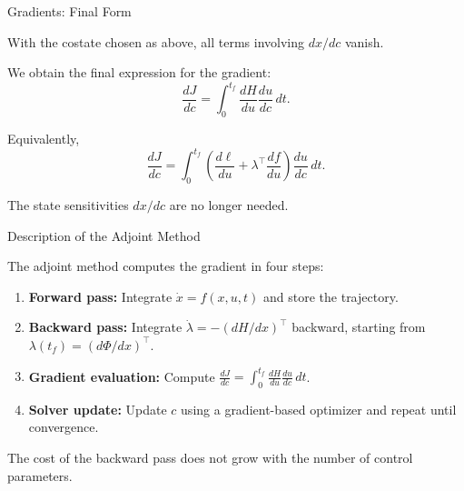 \documentclass{beamer}
\begin{document}
\begin{frame}{Gradients: Final Form}
	\begin{flushleft}
		With the costate chosen as above, all terms involving
		$dx/dc$ vanish.
		
		\bigskip
		
		We obtain the final expression for the gradient:
		\[
		\boxed{
			\frac{dJ}{dc}
			=
			\int_0^{t_f}
			\frac{dH}{du}\frac{du}{dc}\,dt.
		}
		\]
		
		\bigskip
		
		Equivalently,
		\[
		\boxed{
			\frac{dJ}{dc}
			=
			\int_0^{t_f}
			\left(
			\frac{d\ell}{du}
			+\lambda^\top\frac{df}{du}
			\right)
			\frac{du}{dc}\,dt.
		}
		\]
		
		The state sensitivities $dx/dc$ are no longer needed.
	\end{flushleft}
\end{frame}

\begin{frame}{Description of the Adjoint Method}
	\begin{flushleft}
		The adjoint method computes the gradient in four steps:
		
		\begin{enumerate}
			\item \textbf{Forward pass:}
			Integrate $\dot{x}=f(x,u,t)$ and store the trajectory.
			
			\item \textbf{Backward pass:}
			Integrate $\dot{\lambda}=-(dH/dx)^\top$ backward,
			starting from $\lambda(t_f)=(d\Phi/dx)^\top$.
			
			\item \textbf{Gradient evaluation:}
			Compute $\displaystyle
			\frac{dJ}{dc}=\int_0^{t_f}
			\frac{dH}{du}\frac{du}{dc}\,dt$.
			
			\item \textbf{Solver update:}
			Update $c$ using a gradient-based optimizer
			and repeat until convergence.
		\end{enumerate}
		
		\bigskip
		
		The cost of the backward pass does not grow with
		the number of control parameters.
	\end{flushleft}
\end{frame}
\end{document}
